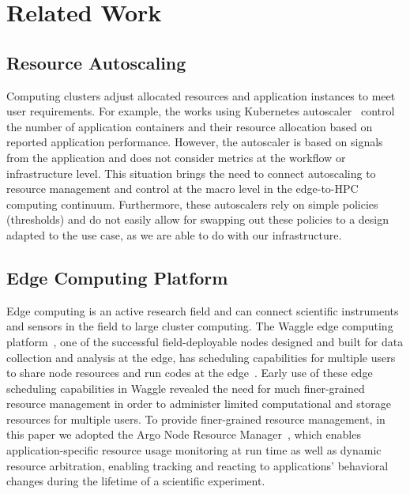 \section{Related Work}
\label{sec:relatedwork}


\subsection{Resource Autoscaling}
Computing clusters adjust allocated resources and application instances to meet user requirements. For example, the works using Kubernetes autoscaler~\cite{ju2021proactive, tran2022survey} control the number of application containers and their resource allocation based on reported application performance. However, the autoscaler is based on signals from the application and does not consider metrics at the workflow or infrastructure level. This situation brings the need to connect autoscaling to resource management and control at the macro level in the edge-to-HPC computing continuum. Furthermore, these autoscalers rely on simple policies (thresholds) and do not easily allow for swapping out these policies to a design adapted to the use case,
as we are able to do with our infrastructure.


\subsection{Edge Computing Platform}
Edge computing is an active research field and can connect scientific instruments and sensors in the field to large cluster computing. The Waggle edge computing platform~\cite{beckman2016waggle}, one of the successful field-deployable nodes designed and built for data collection and analysis at the edge, has scheduling capabilities for multiple users to share node resources and run codes at the edge~\cite{kim2022goal}. Early use of these edge scheduling capabilities in Waggle revealed the need for much finer-grained resource management in order to administer limited computational and storage resources for multiple users. To provide finer-grained resource management, in this paper we adopted the Argo Node Resource Manager~\cite{argo-ipdps-2019}, which enables application-specific resource usage monitoring at run time as well as dynamic resource arbitration, enabling tracking and reacting to applications' behavioral changes during the lifetime of a scientific experiment.